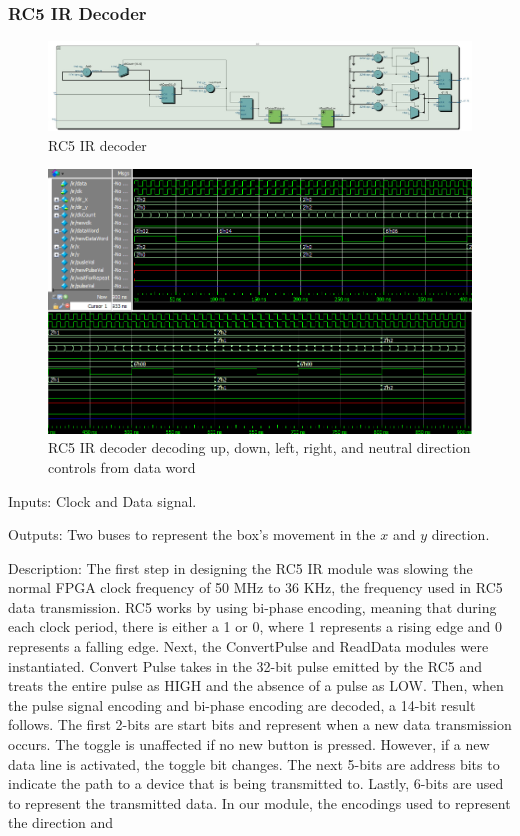 \documentclass[12pt]{article}
\numberwithin{figure}{subsection}
\begin{document}
\subsubsection{RC5 IR Decoder}

\begin{figure}[ht]
  \centering
  \includegraphics[width=\textwidth]{ir.jpg}
  \caption{RC5 IR decoder}
  \label{fig:ir}
\end{figure}

\begin{figure}[ht]
  \centering
  \includegraphics[width=\textwidth]{ir_decoder_simulation.png}
  \caption{RC5 IR decoder decoding up, down, left, right, and neutral direction controls from data word}
  \label{fig:ir_decoder_simulation}
\end{figure}

Inputs: Clock and Data signal.

Outputs: Two buses to represent the box’s movement in the $x$ and $y$ direction.

Description: The first step in designing the RC5 IR module was slowing the normal FPGA clock frequency of 50 MHz to 36 KHz, the frequency used in RC5 data transmission. RC5 works by using bi-phase encoding, meaning that during each clock period, there is either a 1 or 0, where 1 represents a rising edge and 0 represents a falling edge. Next, the ConvertPulse and ReadData modules were instantiated. Convert Pulse takes in the 32-bit pulse emitted by the RC5 and treats the entire pulse as HIGH and the absence of a pulse as LOW. Then, when the pulse signal encoding and bi-phase encoding are decoded, a 14-bit result follows. The first 2-bits are start bits and represent when a new data transmission occurs. The toggle is unaffected if no new button is pressed. However, if a new data line is activated, the toggle bit changes. The next 5-bits are address bits to indicate the path to a device that is being transmitted to. Lastly, 6-bits are used to represent the transmitted data. In our module, the encodings used to represent the direction and
\end{document}
